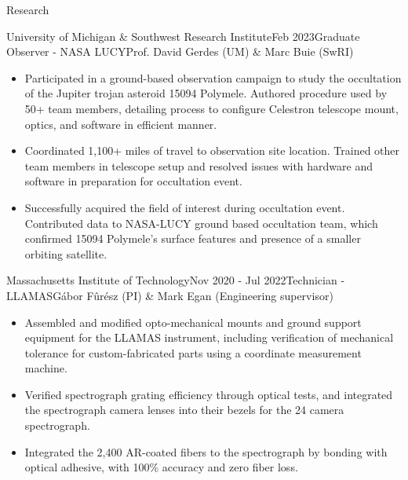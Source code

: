 \documentclass{resume} %
\begin{document}
\begin{rSection}{Research}
\begin{rSubsection}{University of Michigan \& Southwest Research Institute}{Feb 2023}{Graduate Observer - NASA LUCY}{Prof. David Gerdes (UM) \& Marc Buie (SwRI)}
\begin{itemize}
    \item Participated in a ground-based observation campaign to study the occultation of the Jupiter trojan asteroid 15094 Polymele. Authored procedure used by 50+ team members, detailing process to configure Celestron telescope mount, optics, and software in efficient manner.
    \item Coordinated 1,100+ miles of travel to observation site location. Trained other team members in telescope setup and resolved issues with hardware and software in preparation for occultation event.
    \item Successfully acquired the field of interest during occultation event. Contributed data to NASA-LUCY ground based occultation team, which confirmed 15094 Polymele's surface features and presence of a smaller orbiting satellite.
\end{itemize}
\end{rSubsection}



\begin{rSubsection}{Massachusetts Institute of Technology}{Nov 2020 - Jul 2022}{Technician - LLAMAS}{G\'abor F\^ur\'esz (PI) \& Mark Egan (Engineering supervisor)}
\begin{itemize}
\item Assembled and modified opto-mechanical mounts and ground support equipment for the \ac{LLAMAS} instrument, including verification of mechanical tolerance for custom-fabricated parts using a coordinate measurement machine.
\item Verified spectrograph grating efficiency through optical tests, and integrated the spectrograph camera lenses into their bezels for the 24 camera spectrograph.
\item Integrated the 2,400 AR-coated fibers to the spectrograph by bonding with optical adhesive, with 100\% accuracy and zero fiber loss.
\end{itemize}
\end{rSubsection}


\end{rSection}
\end{document}
